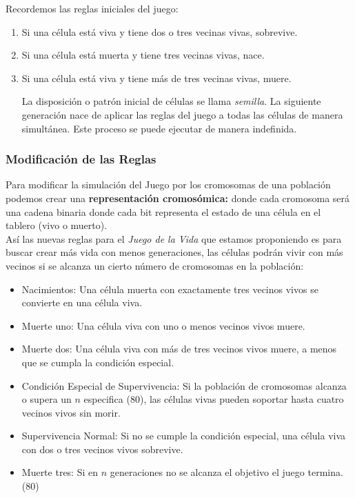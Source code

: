 Recordemos las reglas iniciales del juego:
\begin{enumerate}
    \item Si una célula está viva y tiene dos o tres vecinas vivas, sobrevive.
    \item Si una célula está muerta y tiene tres vecinas vivas, nace.
    \item Si una célula está viva y tiene más de tres vecinas vivas, muere.
    
    La disposición o patrón inicial de células se llama \textit{semilla}. La siguiente 
    generación nace de aplicar las reglas del juego a todas las células de manera 
    simultánea. Este proceso se puede ejecutar de manera indefinida.
\end{enumerate}

\subsubsection*{Modificación de las Reglas}

Para modificar la simulación del Juego por los cromosomas de una población podemos crear
una \textbf{representación cromosómica:} donde cada cromosoma será una cadena binaria 
donde cada bit representa el estado de una célula en el tablero (vivo o muerto).\\ 

Así las nuevas reglas para el \textit{Juego de la Vida} que estamos proponiendo es para 
buscar crear más vida con menos generaciones, las células  podrán vivir con más vecinos 
si se alcanza un cierto número de cromosomas en la población:

\begin{itemize}
    \item Nacimientos: Una célula muerta con exactamente tres vecinos vivos se convierte 
    en una célula viva.
    \item Muerte uno: Una célula viva con uno o menos vecinos vivos muere.
    \item Muerte dos: Una célula viva con más de tres vecinos vivos muere, a menos que se 
    cumpla la condición especial.
    \item Condición Especial de Supervivencia: Si la población de cromosomas alcanza o 
    supera un $n$ especifica (80), las células vivas pueden soportar hasta cuatro 
    vecinos vivos sin morir.
    \item Supervivencia Normal: Si no se cumple la condición especial, una célula viva con 
    dos o tres vecinos vivos sobrevive.
    \item Muerte tres: Si en $n$ generaciones no se alcanza el objetivo el juego termina. (80)
\end{itemize}

